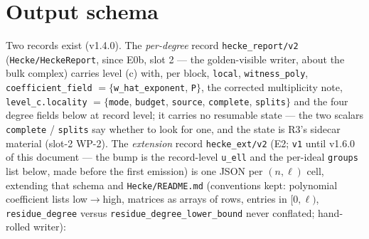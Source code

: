 \documentclass[11pt]{article}
\theoremstyle{remark}
\begin{document}
\section{Output schema}\label{sec:schema}
Two records exist (v1.4.0). The \emph{per-degree} record \texttt{hecke\_report/v2}
(\texttt{Hecke/HeckeReport}, since E0b, slot 2 --- the golden-visible writer, about the bulk
complex) carries level (c) with, per block, \texttt{local}, \texttt{witness\_poly},
\texttt{coefficient\_field} $=\{$\texttt{w\_hat\_exponent}, \texttt{P}$\}$, the corrected
multiplicity note, \texttt{level\_c.locality} $=\{$\texttt{mode}, \texttt{budget},
\texttt{source}, \texttt{complete}, \texttt{splits}$\}$ and the four degree fields below at
record level; it carries no resumable state --- the two scalars \texttt{complete} /
\texttt{splits} say whether to look for one, and the state is R3's sidecar material (slot-2
WP-2). The \emph{extension} record \texttt{hecke\_ext/v2} (E2; \texttt{v1} until v1.6.0 of this
document --- the bump is the record-level \texttt{u\_ell} and the per-ideal
\texttt{groups} list below, made before the first emission) is one JSON per $(n,\ell)$
cell, extending that schema and \texttt{Hecke/README.md} (conventions kept: polynomial
coefficient lists low$\to$high, matrices as arrays of rows, entries in $[0,\ell)$,
\texttt{residue\_degree} versus \texttt{residue\_degree\_lower\_bound} never conflated;
hand-rolled writer):
\end{document}
